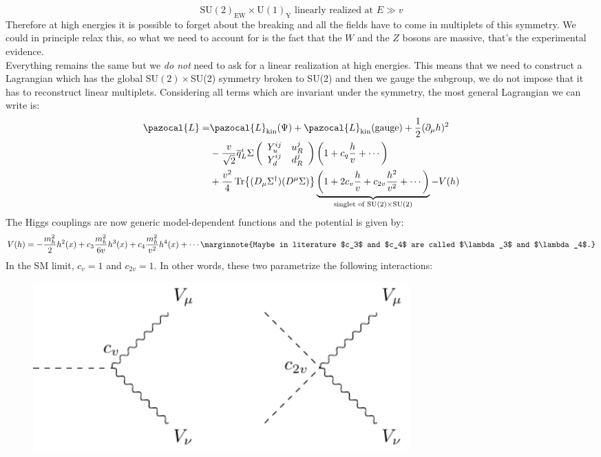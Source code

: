 \documentclass[../main.tex]{subfiles}
\begin{document}
\[
\text{SU$(2)_{\text{EW}}\times$U$(1)_{\text{Y}}$ linearly realized at $E\gg v$}
\]
Therefore at high energies it is possible to forget about the breaking and all the fields have to come in multiplets of this symmetry. We could in principle relax this, so what we need to account for is the fact that the $W$ and the $Z$ bosons are massive, that's the experimental evidence.\\
Everything remains the same but we \textit{do not} need to ask for a linear realization at high energies. This means that we need to construct a Lagrangian which has the global SU$(2)\times$SU(2) symmetry broken to SU(2) and then we gauge the subgroup, we do not impose that it has to reconstruct linear multiplets. Considering all terms which are invariant under the symmetry, the most general Lagrangian we can write is:
\begin{align*}
\pazocal{L}=&\pazocal{L}_{\text{kin}}(\Psi)+\pazocal{L}_{\text{kin}}(\text{gauge})+\frac{1}{2}(\partial_\mu h)^2\\
&-\frac{v}{\sqrt{2}}\overline{q}_L^i\Sigma\left(\begin{array}{cc}
    Y_u^{ij} & u_R^j \\
    Y_d^{ij} & d_R^j
\end{array}\right)\left(1+c_q\frac{h}{v}+\cdots\right)\\
&+\frac{v^2}{4}\Tr{(D_\mu\Sigma^\dagger)(D^\mu\Sigma)}\underbrace{\left(1+2c_v\frac{h}{v}+c_{2v}\frac{h^2}{v^2}+\cdots\right)}_{\text{singlet of SU$(2)\times$SU(2)}}-V(h)
\end{align*}
The Higgs couplings are now generic model-dependent functions and the potential is given by:
\[
V(h)=-\frac{m_h^2}{2}h^2(x)+c_3\frac{m_h^2}{6v}h^3(x)+c_4\frac{m_h^2}{v^2}h^4(x)+\cdots\marginnote{Maybe in literature $c_3$ and $c_4$ are called $\lambda_3$ and $\lambda_4$.}
\]
In the SM limit, $c_v=1$ and $c_{2v}=1$. In other words, these two parametrize the following interactions:
\begin{figure}[h]
    \centering
    \includegraphics[width=0.7\textwidth]{Images/cvc2v.pdf}
    \caption*{}
\end{figure}\\
\end{document}
